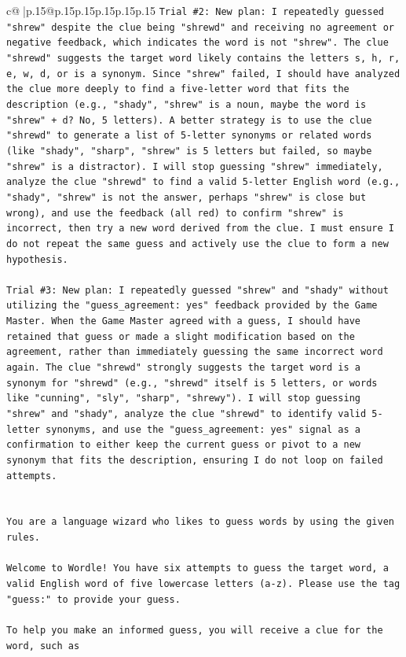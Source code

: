 \documentclass{article}
\begin{document}
{\begin{supertabular}{c@{$\;$}|p{.15\linewidth}@{}p{.15\linewidth}p{.15\linewidth}p{.15\linewidth}p{.15\linewidth}p{.15\linewidth}}
{{{\texttt{Trial \#2: New plan: I repeatedly guessed "shrew" despite the clue being "shrewd" and receiving no agreement or negative feedback, which indicates the word is not "shrew". The clue "shrewd" suggests the target word likely contains the letters s, h, r, e, w, d, or is a synonym. Since "shrew" failed, I should have analyzed the clue more deeply to find a five{-}letter word that fits the description (e.g., "shady", "shrew" is a noun, maybe the word is "shrew" + d? No, 5 letters). A better strategy is to use the clue "shrewd" to generate a list of 5{-}letter synonyms or related words (like "shady", "sharp", "shrew" is 5 letters but failed, so maybe "shrew" is a distractor). I will stop guessing "shrew" immediately, analyze the clue "shrewd" to find a valid 5{-}letter English word (e.g., "shady", "shrew" is not the answer, perhaps "shrew" is close but wrong), and use the feedback (all red) to confirm "shrew" is incorrect, then try a new word derived from the clue. I must ensure I do not repeat the same guess and actively use the clue to form a new hypothesis.} \\
\\ 
\texttt{Trial \#3: New plan: I repeatedly guessed "shrew" and "shady" without utilizing the "guess\_agreement: yes" feedback provided by the Game Master. When the Game Master agreed with a guess, I should have retained that guess or made a slight modification based on the agreement, rather than immediately guessing the same incorrect word again. The clue "shrewd" strongly suggests the target word is a synonym for "shrewd" (e.g., "shrewd" itself is 5 letters, or words like "cunning", "sly", "sharp", "shrewy"). I will stop guessing "shrew" and "shady", analyze the clue "shrewd" to identify valid 5{-}letter synonyms, and use the "guess\_agreement: yes" signal as a confirmation to either keep the current guess or pivot to a new synonym that fits the description, ensuring I do not loop on failed attempts.} \\
\\ 
\\ 
\texttt{You are a language wizard who likes to guess words by using the given rules.} \\
\\ 
\texttt{Welcome to Wordle! You have six attempts to guess the target word, a valid English word of five lowercase letters (a{-}z). Please use the tag "guess:" to provide your guess.} \\
\\ 
\texttt{To help you make an informed guess, you will receive a clue for the word, such as} \\
}}}
\end{supertabular}}
\end{document}
